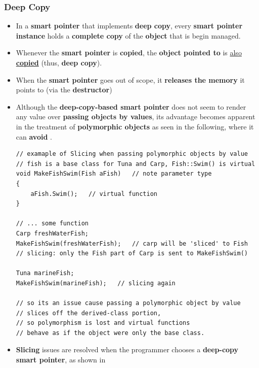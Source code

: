 \documentclass[10pt]{article}
\newcommand{\pbreak}{\vspace{30pt}}
\newcommand{\vocab}[1]{\fbox{\textbf{\textit{#1}}}}
\begin{document}
\subsubsection{Deep Copy}
\begin{itemize}
	\item In a \textbf{smart pointer} that implements \textbf{deep copy}, every \textbf{smart pointer instance} holds a \textbf{complete copy} of the \textbf{object} that is begin managed.

	\item Whenever the \textbf{smart pointer} is \textbf{copied}, the \textbf{object pointed to} is \underline{also \textbf{copied}} (thus, \textbf{deep copy}).

	\item When the \textbf{smart pointer} goes out of scope, it \textbf{releases the memory} it points to (via the \textbf{destructor})

		\pbreak

	\item Although the \textbf{deep-copy-based smart pointer} does not seem to render any value over \textbf{passing objects by values}, its advantage becomes apparent in the treatment of \textbf{polymorphic objects} as seen in the following, where it can \textbf{avoid \vocab{slicing}}.

		\begin{verbatim}
// examaple of Slicing when passing polymorphic objects by value 
// fish is a base class for Tuna and Carp, Fish::Swim() is virtual
void MakeFishSwim(Fish aFish)	// note parameter type
{
	aFish.Swim();	// virtual function
}

// ... some function
Carp freshWaterFish;
MakeFishSwim(freshWaterFish);	// carp will be 'sliced' to Fish
// slicing: only the Fish part of Carp is sent to MakeFishSwim()

Tuna marineFish;
MakeFishSwim(marineFish);	// slicing again

// so its an issue cause passing a polymorphic object by value 
// slices off the derived-class portion, 
// so polymorphism is lost and virtual functions 
// behave as if the object were only the base class.
		\end{verbatim}

		\pbreak
		
	\item \textbf{Slicing} issues are resolved when the programmer chooses a \textbf{deep-copy smart pointer}, as shown in 


\end{itemize}
\end{document}
